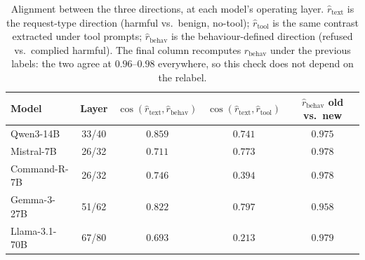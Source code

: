 \begin{table}[t]
\centering
\caption{Alignment between the three directions, at each model's operating layer.
$\hat{r}_{\text{text}}$ is the request-type direction (harmful vs.\ benign, no-tool);
$\hat{r}_{\text{tool}}$ is the same contrast extracted under tool prompts;
$\hat{r}_{\text{behav}}$ is the behaviour-defined direction (refused vs.\ complied harmful).
The final column recomputes $\hat{r}_{\text{behav}}$ under the previous labels: the two agree
at $0.96$--$0.98$ everywhere, so this check does not depend on the relabel.}
\label{tab:cosine}
  \begin{tabular}{lcccc}
\toprule
Model & Layer & $\cos(\hat{r}_{\text{text}},\hat{r}_{\text{behav}})$ & $\cos(\hat{r}_{\text{text}},\hat{r}_{\text{tool}})$ & $\hat{r}_{\text{behav}}$ old vs.\ new \\
\midrule
Qwen3-14B      & 33/40 & $0.859$ & $0.741$ & $0.975$ \\
Mistral-7B     & 26/32 & $0.711$ & $0.773$ & $0.978$ \\
Command-R-7B   & 26/32 & $0.746$ & $0.394$ & $0.978$ \\
Gemma-3-27B    & 51/62 & $0.822$ & $0.797$ & $0.958$ \\
Llama-3.1-70B  & 67/80 & $0.693$ & $0.213$ & $0.979$ \\
\bottomrule
\end{tabular}
\end{table}

